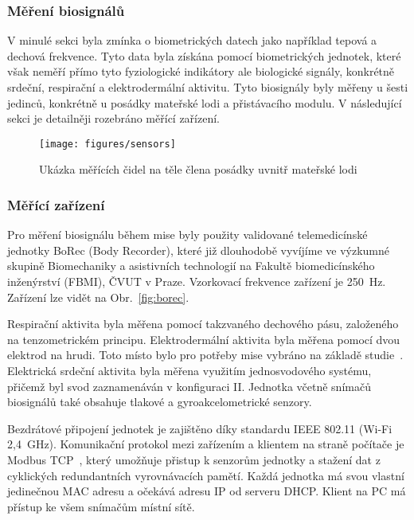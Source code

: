 \subsubsection{Měření biosignálů}
\label{subsubsec:mereni_biosignalu}
V minulé sekci byla zmínka o biometrických datech jako například tepová a
dechová frekvence. Tyto data byla získána pomocí biometrických jednotek, které
však neměří přímo tyto fyziologické indikátory ale biologické signály, konkrétně
srdeční, respirační a elektrodermální aktivitu. Tyto biosignály byly měřeny u
šesti jedinců, konkrétně u posádky mateřské lodi a přistávacího modulu. V
následující sekci je detailněji rozebráno měřící zařízení.

\begin{figure}[h]
    \begin{center}
        \texttt{[image: figures/sensors]}
        \caption{Ukázka měřících čidel na těle člena posádky uvnitř mateřské lodi}
        \label{fig:sensors}
    \end{center}
\end{figure}

\subsubsection{Měřící zařízení}
\label{subsubsec:merici_zarizeni}
Pro měření biosignálu během mise byly použity validované telemedicínské jednotky
BoRec (Body Recorder), které již dlouhodobě vyvíjíme ve výzkumné skupině
Biomechaniky a asistivních technologií na Fakultě biomedicínského inženýrství
(\gls{FBMI}), ČVUT v Praze. Vzorkovací frekvence zařízení je 250~Hz. Zařízení
lze vidět na Obr.~\ref{fig:borec}.

Respirační aktivita byla měřena pomocí takzvaného dechového pásu, založeného na
tenzometrickém principu. Elektrodermální aktivita byla měřena pomocí dvou
elektrod na hrudi. Toto místo bylo pro potřeby mise vybráno na základě
studie~\cite{Janssen2012}. Elektrická srdeční aktivita byla měřena využitím
jednosvodového systému, přičemž byl svod zaznamenáván v konfiguraci II. Jednotka
včetně snímačů biosignálů také obsahuje tlakové a gyroakcelometrické senzory.

Bezdrátové připojení jednotek je zajištěno díky standardu IEEE 802.11 (Wi-Fi
2,4~GHz). Komunikační protokol mezi zařízením a klientem na straně počítače je
Modbus TCP~\cite{modbus}, který umožňuje přistup k senzorům jednotky a stažení
dat z cyklických redundantních vyrovnávacích pamětí. Každá jednotka má svou
vlastní jedinečnou MAC adresu a očekává adresu IP od serveru DHCP. Klient na PC
má přístup ke všem snímačům místní sítě.

